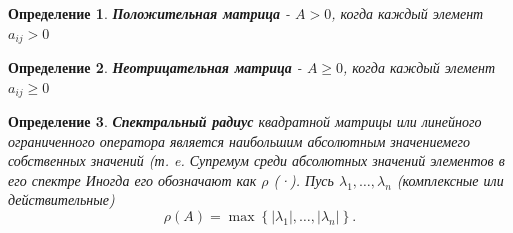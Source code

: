 \documentclass[a4paper,12pt,leqno]{article} %
\newtheorem{definition}{Определение}
\begin{document}


\pagebreak    


\begin{definition}
    \textbf{Положительная матрица} - $A > 0$, когда каждый элемент $a_{ij} > 0$
\end{definition}

\begin{definition}
    \textbf{Неотрицательная матрица} - $A \geq 0$, когда каждый элемент $a_{ij} \geq 0$
\end{definition}


\begin{definition}
    \textbf{Спектральный радиус} 
    квадратной матрицы или линейного ограниченного оператора 
    является наибольшим абсолютным значениемего собственных значений 
    (т. e. Супремум среди абсолютных значений элементов в его спектре
    Иногда его обозначают как $\rho$ (·).
    Пусь $\lambda_1, \dotsc, \lambda_n $ (комплексные или действительные)
    \[\rho(A) = \max \left \{ |\lambda_1|, \dotsc, |\lambda_n| \right \}.\]
\end{definition}
\end{document}
